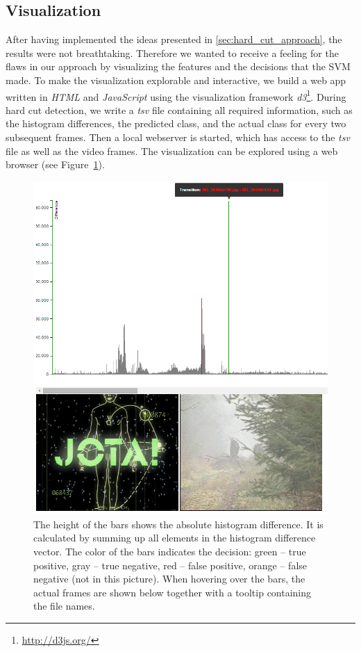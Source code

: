 \subsection{Visualization}
\label{sec:hard_cut_visualization}

After having implemented the ideas presented in \ref{sec:hard_cut_approach}, the results were not breathtaking.
Therefore we wanted to receive a feeling for the flaws in our approach by visualizing the features and the decisions that the SVM made.
To make the visualization explorable and interactive, we build a web app written in \emph{HTML} and \emph{JavaScript} using the visualization framework \emph{d3}\footnote{\url{http://d3js.org/}}.
During hard cut detection, we write a \emph{tsv} file containing all required information, such as the histogram differences, the predicted class, and the actual class for every two subsequent frames.
Then a local webserver is started, which has access to the \emph{tsv} file as well as the video frames.
The visualization can be explored using a web browser (see Figure~\ref{fig:hard_cut_visualization}).

\begin{figure}
	\centering
	\includegraphics[scale=.7]{images/hard_cut_visualization.png}
	\caption{The height of the bars shows the absolute histogram difference.
    It is calculated by summing up all elements in the histogram difference vector.
    The color of the bars indicates the decision: green -- true positive, gray -- true negative, red -- false positive, orange -- false negative (not in this picture).
    When hovering over the bars, the actual frames are shown below together with a tooltip containing the file names.}
	\label{fig:hard_cut_visualization}
\end{figure}

